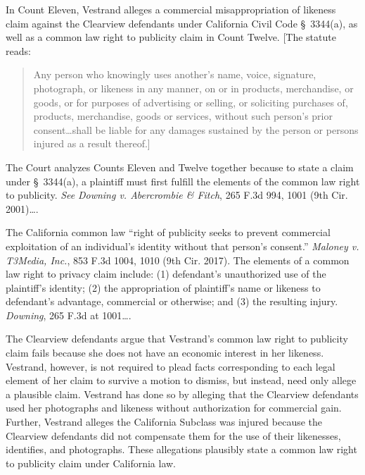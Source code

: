 In Count Eleven, Vestrand alleges a commercial misappropriation of 
likeness claim against the Clearview defendants under California Civil 
Code \S~3344(a), as well as a common law right to publicity claim in 
Count Twelve.
[The statute reads:
\begin{quote}
Any person who knowingly uses another's name, 
voice, signature, photograph, or likeness in any manner, on or in
 products, merchandise, or goods, or for purposes of advertising or 
selling, or soliciting purchases of, products, merchandise, goods or 
services, without such person's prior consent\ldots shall be liable for 
any damages sustained by the person or persons injured as a result 
thereof.]
\end{quote}
The Court analyzes Counts Eleven and Twelve together 
because to state a claim under \S~3344(a), a plaintiff must first fulfill
 the elements of the common law right to publicity. \textit{See} \textit{Downing
v. Abercrombie \& Fitch}, 265 F.3d 994, 1001 (9th Cir. 2001)\ldots.

The California common law ``right of publicity seeks to prevent 
commercial exploitation of an individual's identity without that 
person's consent.'' \textit{Maloney v. T3Media, Inc.}, 853 F.3d 1004, 1010 (9th Cir. 2017).
 The elements of a common law right to privacy claim include: (1) 
defendant's unauthorized use of the plaintiff's identity; (2) the 
appropriation of plaintiff's name or likeness to defendant's advantage, 
commercial or otherwise; and (3) the resulting injury. \textit{Downing}, 265
F.3d at 1001\ldots.

The Clearview defendants argue that Vestrand's common law right to 
publicity claim fails because she does not have an economic interest in 
her likeness. Vestrand, however, is not required to plead facts 
corresponding to each legal element of her claim to survive a motion to 
dismiss, but instead, need only allege a plausible claim.
Vestrand has done so by alleging that the Clearview defendants used her
photographs and likeness without authorization for commercial gain. 
Further, Vestrand alleges the California Subclass was injured because 
the Clearview defendants did not compensate them for the use of their 
likenesses, identifies, and photographs. These allegations plausibly 
state a common law right to publicity claim under California law.


